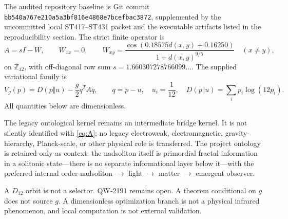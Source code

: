 \documentclass[11pt,a4paper]{article}
\begin{document}
The audited repository baseline is Git commit
\texttt{bb540a767e210a5a3bf816e4868e7bcefbac3872}, supplemented by the
uncommitted local ST417--ST431 packet and the executable artifacts listed in
the reproducibility section.  The strict finite operator is
\begin{equation}\label{eq:A}
 A=sI-W,\qquad W_{xx}=0,\qquad
 W_{xy}=\frac{\cos(0.18575d(x,y)+0.16250)}{1+d(x,y)^{9/5}}\quad(x\ne y),
\end{equation}
on $\mathbb Z_{12}$, with off-diagonal row sum
$s=1.660307278766099\ldots$.  The supplied variational family is
\begin{equation}\label{eq:V}
 V_g(p)=D(p\Vert u)-\frac g2q^TAq,\qquad
 q=p-u,\quad u_i=\frac1{12},\quad
 D(p\Vert u)=\sum_i p_i\log(12p_i).
\end{equation}
All quantities below are dimensionless.

The legacy ontological kernel remains an intermediate bridge kernel.  It is
not silently identified with \eqref{eq:A}; no legacy electroweak,
electromagnetic, gravity-hierarchy, Planck-scale, or other physical role is
transferred.  The project ontology is retained only as context: the nadsoliton
itself is primordial fractal information in a solitonic state---there is no
separate informational layer below it---with the preferred internal order
nadsoliton $\to$ light $\to$ matter $\to$ emergent observer.

A $D_{12}$ orbit is not a selector.  QW-2191 remains open.  A theorem
conditional on $g$ does not source $g$.  A dimensionless optimization branch
is not a physical infrared phenomenon, and local computation is not external
validation.
\end{document}
